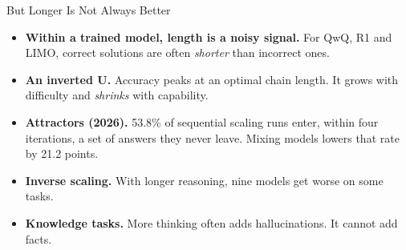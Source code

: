 \begin{frame}{But Longer Is Not Always Better}
    \begin{itemize}\itemsep0.45em
        \item \textbf{Within a trained model, length is a noisy signal.} For QwQ, R1 and LIMO, correct solutions are often \emph{shorter} than incorrect ones.
        \item \textbf{An inverted U.} Accuracy peaks at an optimal chain length. It grows with difficulty and \emph{shrinks} with capability.
        \item \textbf{Attractors (2026).} 53.8\% of sequential scaling runs enter, within four iterations, a set of answers they never leave. Mixing models lowers that rate by 21.2 points.
        \item \textbf{Inverse scaling.} With longer reasoning, nine models get worse on some tasks.
        \item \textbf{Knowledge tasks.} More thinking often adds hallucinations. It cannot add facts.
    \end{itemize}
    \vspace{0.1em}
\end{frame}

